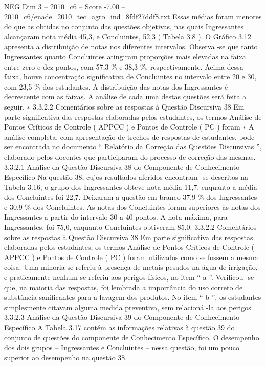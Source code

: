 \begin{textsample}{NEG Dim 3 – 2010\_c6 – Score -7.00 – 2010\_c6/enade\_2010\_tec\_agro\_ind\_8fdf27ddf8.txt}
Essas médias foram menores do que as obtidas no conjunto das questões objetivas, nas quais Ingressantes alcançaram nota média 45,3, e Concluintes, 52,3 ( Tabela 3.8 ).
O Gráfico 3.12 apresenta a distribuição de notas nos diferentes intervalos.
Observa -se que tanto Ingressantes quanto Concluintes atingiram proporções mais elevadas na faixa entre zero e dez pontos, com 57,3 \% e 38,3 \%, respectivamente.
Acima dessa faixa, houve concentração significativa de Concluintes no intervalo entre 20 e 30, com 23,5 \% dos estudantes.
A distribuição das notas dos Ingressantes é decrescente com as faixas.
A análise de cada uma destas questões será feita a seguir. ∗ 3.3.2.2 Comentários sobre as respostas à Questão Discursiva 38 Em parte significativa das respostas elaboradas pelos estudantes, os termos Análise de Pontos Críticos de Controle ( APPCC ) e Pontos de Controle ( PC ) foram ∗ A análise completa, com apresentação de trechos de respostas de estudantes, pode ser encontrada no documento “ Relatório da Correção das Questões Discursivas ”, elaborado pelos docentes que participaram do processo de correção das mesmas. 3.3.2.1 Análise da Questão Discursiva 38 do Componente de Conhecimento Específico Na questão 38, cujos resultados aferidos encontram -se descritos na Tabela 3.16, o grupo dos Ingressantes obteve nota média 11,7, enquanto a média dos Concluintes foi 22,7.
Deixaram a questão em branco 37,9 \% dos Ingressantes e 30,9 \% dos Concluintes.
As notas dos Concluintes foram superiores às notas dos Ingressantes a partir do intervalo 30 a 40 pontos.
A nota máxima, para Ingressantes, foi 75,0, enquanto Concluintes obtiveram 85,0. 3.3.2.2 Comentários sobre as respostas à Questão Discursiva 38 Em parte significativa das respostas elaboradas pelos estudantes, os termos Análise de Pontos Críticos de Controle ( APPCC ) e Pontos de Controle ( PC ) foram utilizados como se fossem a mesma coisa.
Uma minoria se referiu à presença de metais pesados na água de irrigação, e praticamente nenhum se referiu aos perigos físicos, no item “ a ”.
Verificou -se que, na maioria das respostas, foi lembrada a importância do uso correto de substância sanificantes para a lavagem dos produtos.
No item “ b ”, os estudantes simplesmente citavam alguma medida preventiva, sem relacioná -la aos perigos. 3.3.2.3 Análise da Questão Discursiva 39 do Componente de Conhecimento Específico A Tabela 3.17 contém as informações relativas à questão 39 do conjunto de questões do componente de Conhecimento Específico.
O desempenho dos dois grupos – Ingressantes e Concluintes – nessa questão, foi um pouco superior ao desempenho na questão 38.

\end{textsample}
